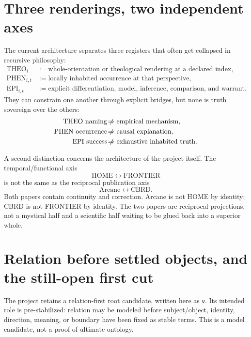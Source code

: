 \documentclass[11pt]{article}
\newcommand{\VR}{\mathsf{v}}
\newcommand{\nrightarrowbyitself}{\mathrel{\not\!\Rightarrow}}
\begin{document}
\section{Three renderings, two independent axes}

The current architecture separates three registers that often get collapsed in recursive philosophy:
\begin{align}
\mathrm{THEO}_i &:= \text{whole-orientation or theological rendering at a declared index},\\
\mathrm{PHEN}_{i,t} &:= \text{locally inhabited occurrence at that perspective},\\
\mathrm{EPI}_{i,t} &:= \text{explicit differentiation, model, inference, comparison, and warrant}.
\end{align}
They can constrain one another through explicit bridges, but none is truth sovereign over the others:
\begin{align}
\mathrm{THEO\ naming}&\nrightarrowbyitself\mathrm{empirical\ mechanism},\\
\mathrm{PHEN\ occurrence}&\nrightarrowbyitself\mathrm{causal\ explanation},\\
\mathrm{EPI\ success}&\nrightarrowbyitself\mathrm{exhaustive\ inhabited\ truth}.
\end{align}

A second distinction concerns the architecture of the project itself. The temporal/functional axis
\begin{equation}
\mathrm{HOME}\leftrightarrow\mathrm{FRONTIER}
\end{equation}
is not the same as the reciprocal publication axis
\begin{equation}
\mathrm{Arcane}\leftrightarrow\mathrm{CBRD}.
\end{equation}
Both papers contain continuity and correction. Arcane is not HOME by identity; CBRD is not FRONTIER by identity. The two papers are reciprocal projections, not a mystical half and a scientific half waiting to be glued back into a superior whole.

\section{Relation before settled objects, and the still-open first cut}

The project retains a relation-first root candidate, written here as $\VR$. Its intended role is pre-stabilized: relation may be modeled before subject/object, identity, direction, meaning, or boundary have been fixed as stable terms. This is a model candidate, not a proof of ultimate ontology.
\end{document}
